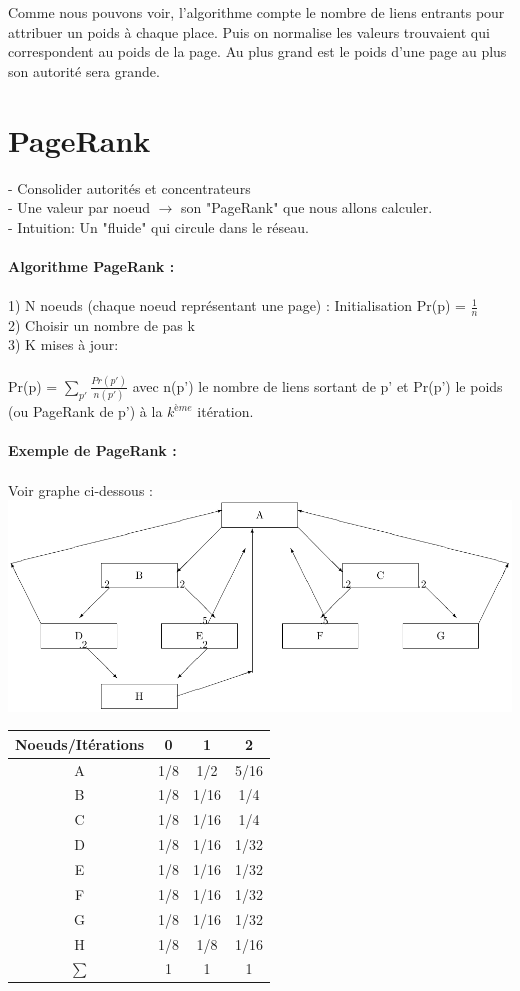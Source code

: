  Comme nous pouvons voir, l'algorithme compte le nombre de liens entrants pour attribuer un poids à chaque place. Puis on normalise les valeurs trouvaient qui correspondent au poids de la page.
 Au plus grand est le poids d'une page au plus son autorité sera grande.\\
\section{PageRank}

- Consolider autorités et concentrateurs  \\
- Une valeur par noeud $ \rightarrow $ son "PageRank" que nous allons calculer. \\
- Intuition: Un "fluide" qui circule dans le réseau. \\
 \\
 \textbf{ Algorithme PageRank :}\\
 \\
 1) N noeuds (chaque noeud représentant une page) : Initialisation Pr(p) =  $\frac{1}{n}$\\
 2) Choisir un nombre de pas k\\
 3) K mises à jour:\\
 \\
 Pr(p) = $ \sum_ {p'}\frac{Pr(p')}{n(p')} $ avec n(p') le nombre de liens sortant de p' et Pr(p') le poids (ou PageRank de p') à la $k^{ème}$ itération.\\
 \\
 \textbf{Exemple de PageRank :}\\
 \\
 Voir graphe ci-dessous : \\
 
 \includegraphics[scale=0.8]{images/24_imagePr.pdf}
 
 	\begin{tabular}{|c| c |c |c |}
		\hline
		Noeuds/Itérations & 0 & 1 & 2 \\
		\hline
		A & 1/8 & 1/2 & 5/16 \\
		B & 1/8 & 1/16 &  1/4   \\
		C & 1/8 & 1/16 & 1/4    \\
		D & 1/8 & 1/16 & 1/32  \\
		E & 1/8 & 1/16 &  1/32   \\
		F & 1/8 & 1/16 & 1/32    \\
		G & 1/8 & 1/16 & 1/32    \\
		H & 1/8 & 1/8 &  1/16   \\
		\hline
		$\sum $ & 1 & 1 & 1 \\
		\hline
	\end{tabular}

